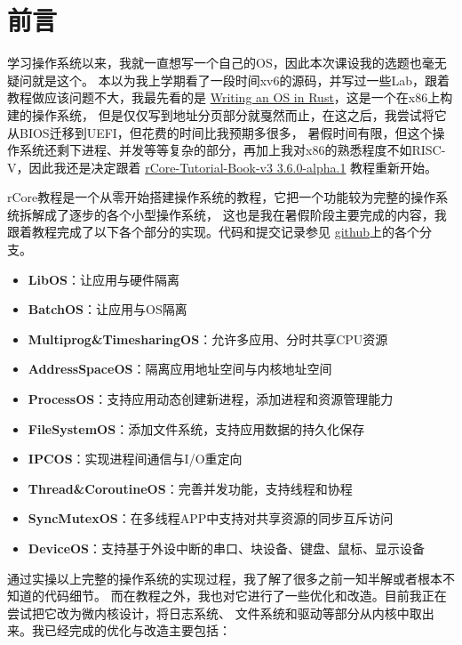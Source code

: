 \chapter*{前言}

学习操作系统以来，我就一直想写一个自己的OS，因此本次课设我的选题也毫无疑问就是这个。
本以为我上学期看了一段时间xv6的源码，并写过一些Lab，跟着教程做应该问题不大，我最先看的是
\href{https://os.phil-opp.com/}{Writing an OS in Rust}，这是一个在x86上构建的操作系统，
但是仅仅写到地址分页部分就戛然而止，在这之后，我尝试将它从BIOS迁移到UEFI，但花费的时间比我预期多很多，
暑假时间有限，但这个操作系统还剩下进程、并发等等复杂的部分，再加上我对x86的熟悉程度不如RISC-V，因此我还是决定跟着
\href{https://rcore-os.cn/rCore-Tutorial-Book-v3/index.html}{rCore-Tutorial-Book-v3 3.6.0-alpha.1}
教程重新开始。

rCore教程是一个从零开始搭建操作系统的教程，它把一个功能较为完整的操作系统拆解成了逐步的各个小型操作系统，
这也是我在暑假阶段主要完成的内容，我跟着教程完成了以下各个部分的实现。代码和提交记录参见
\href{https://github.com/Tinuvile/NimlothOS}{github}上的各个分支。

\begin{itemize}
    \item \textbf{LibOS}：让应用与硬件隔离
    \item \textbf{BatchOS}：让应用与OS隔离
    \item \textbf{Multiprog\&TimesharingOS}：允许多应用、分时共享CPU资源
    \item \textbf{AddressSpaceOS}：隔离应用地址空间与内核地址空间
    \item \textbf{ProcessOS}：支持应用动态创建新进程，添加进程和资源管理能力
    \item \textbf{FileSystemOS}：添加文件系统，支持应用数据的持久化保存
    \item \textbf{IPCOS}：实现进程间通信与I/O重定向
    \item \textbf{Thread\&CoroutineOS}：完善并发功能，支持线程和协程
    \item \textbf{SyncMutexOS}：在多线程APP中支持对共享资源的同步互斥访问
    \item \textbf{DeviceOS}：支持基于外设中断的串口、块设备、键盘、鼠标、显示设备    
\end{itemize}

通过实操以上完整的操作系统的实现过程，我了解了很多之前一知半解或者根本不知道的代码细节。
而在教程之外，我也对它进行了一些优化和改造。目前我正在尝试把它改为微内核设计，将日志系统、
文件系统和驱动等部分从内核中取出来。我已经完成的优化与改造主要包括：

